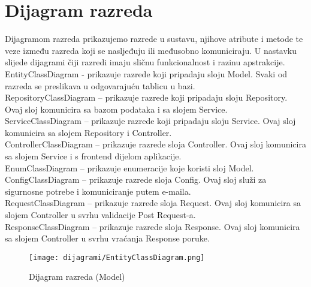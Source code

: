 			\eject

			
		\section{Dijagram razreda}
		
			Dijagramom razreda prikazujemo razrede u sustavu, njihove atribute i metode te veze između razreda koji se nasljeđuju ili međusobno komuniciraju. U nastavku slijede dijagrami čiji razredi imaju sličnu funkcionalnost i razinu apstrakcije.\\

            EntityClassDiagram - prikazuje razrede koji pripadaju sloju Model. Svaki od razreda se preslikava u odgovarajuću tablicu u bazi.\\

            RepositoryClassDiagram – prikazuje razrede koji pripadaju sloju Repository. Ovaj sloj komunicira sa bazom podataka i sa slojem Service.\\

            ServiceClassDiagram – prikazuje razrede koji pripadaju sloju Service. Ovaj sloj komunicira sa slojem Repository i Controller.\\

            ControllerClassDiagram – prikazuje razrede sloja Controller. Ovaj sloj komunicira sa slojem Service i s frontend dijelom aplikacije.\\

            EnumClassDiagram – prikazuje enumeracije koje koristi sloj Model.\\

            ConfigClassDiagram – prikazuje razrede sloja Config. Ovaj sloj služi za sigurnosne potrebe i komuniciranje putem e-maila.\\

            RequestClassDiagram – prikazuje razrede sloja Request. Ovaj sloj komunicira sa slojem Controller u svrhu validacije Post Request-a.\\

            ResponseClassDiagram – prikazuje razrede sloja Response. Ovaj sloj komunicira sa slojem Controller u svrhu vraćanja Response poruke.
			
			\begin{figure}[H]
			         \texttt{[image: dijagrami/EntityClassDiagram.png]}
			         \centering
			         \caption{Dijagram razreda (Model)}
			         \label{fig:EntityClassDiagram}
		          \end{figure}

